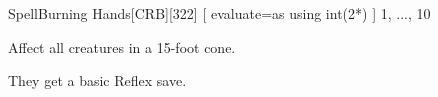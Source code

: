 
\begin{card-collection}{Spell}{\level}{Burning Hands}[CRB][322]{
  [
    evaluate=\level as \dice using int(2*\level)
  ] \level
}{1, ..., 10}%



Affect all creatures in a 15-foot cone.

They get a basic Reflex save.

\end{card-collection}%

